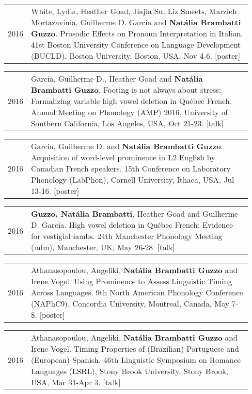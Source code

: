 \documentclass[letterpaper,10pt]{article}
\begin{document}
\begin{tabular}{p{1cm}p{16cm}}
2016 & White, Lydia, Heather Goad, Jiajia Su, Liz Smeets, Marzieh Mortazavinia, Guilherme D. Garcia and \textbf{Nat\'alia Brambatti Guzzo}. Prosodic Effects on Pronoun Interpretation in Italian. 41st Boston University Conference on Language Development (BUCLD), Boston University, Boston, USA, Nov 4-6. [poster]%
\end{tabular}


\begin{tabular}{p{1cm}p{16cm}}
2016 & Garcia, Guilherme D., Heather Goad and \textbf{Nat\'alia Brambatti Guzzo}. Footing is not always about stress: Formalizing variable high vowel deletion in Qu\'ebec French. Annual Meeting on Phonology (AMP) 2016, University of Southern California, Los Angeles, USA, Oct 21-23. [talk] %
\end{tabular}


\begin{tabular}{p{1cm}p{16cm}}	
 2016 & Garcia, Guilherme D. and \textbf{Nat\'alia Brambatti Guzzo}. Acquisition of word-level prominence in L2 English by Canadian French speakers. {15th Conference on Laboratory Phonology (LabPhon)}, Cornell University, Ithaca, USA, Jul 13-16. [poster]%
 \end{tabular}


\begin{tabular}{p{1cm}p{16cm}}	
 2016 & \textbf{Guzzo, Nat\'alia Brambatti}, Heather Goad and Guilherme D. Garcia. High vowel deletion in Qu\'ebec French: Evidence for vestigial iambs. 24th Manchester Phonology Meeting (mfm), Manchester, UK, May 26-28. [talk] %
 \end{tabular}


\begin{tabular}{p{1cm}p{16cm}}	
 2016 & Athanasopoulou, Angeliki, \textbf{Nat\'alia Brambatti Guzzo} and Irene Vogel. Using Prominence to Assess Linguistic Timing Across Languages. {9th North American Phonology Conference (NAPhC9)}, Concordia University, Montreal, Canada, May 7-8. [poster]
 \end{tabular}


\begin{tabular}{p{1cm}p{16cm}}	
 2016 & Athanasopoulou, Angeliki, \textbf{Nat\'alia Brambatti Guzzo} and Irene Vogel. Timing Properties of (Brazilian) Portuguese and (European) Spanish. {46th Linguistic Symposium on Romance Languages (LSRL)}, Stony Brook University, Stony Brook, USA, Mar 31-Apr 3. [talk]
 \end{tabular}
\end{document}
